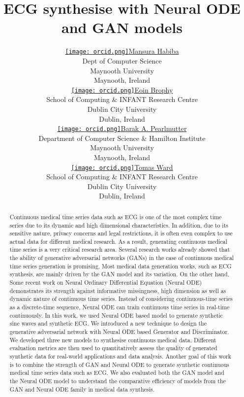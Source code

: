 \documentclass{article}
\title{ECG synthesise with Neural ODE and GAN models}
\author{ 
	\href{https://orcid.org/0000-0001-9051-1370}{\texttt{[image: orcid.png]}\hspace{1mm}Mansura Habiba} \\
	Dept of Computer Science\\
	Maynooth University\\
	Maynooth, Ireland \\
	\AND
	\href{https://orcid.org/0000-0002-6486-5746}{\texttt{[image: orcid.png]}\hspace{1mm}Eoin Brophy} \\
	School of Computing  \& INFANT Research Centre\\
		Dublin City University\\
	Dublin, Ireland \\
	\AND
	\href{https://orcid.org/0000-0003-0521-4553}{\texttt{[image: orcid.png]}\hspace{1mm}Barak A. Pearlmutter} \\
	Department of Computer Science \& Hamilton Institute\\
	Maynooth University\\
	Maynooth, Ireland \\
	\AND
	\href{https://orcid.org/0000-0002-6173-6607}{\texttt{[image: orcid.png]}\hspace{1mm}Tomas Ward} \\
	School of Computing  \& INFANT Research Centre\\
		Dublin City University\\
	Dublin, Ireland \\
}
\begin{document}
\maketitle

\begin{abstract}
 Continuous medical time series data such as ECG is one of the most complex time series due to its dynamic and high dimensional characteristics. In addition, due to its sensitive nature, privacy concerns and legal restrictions, it is often even complex to use actual data for different medical research. As a result, generating continuous medical time series is a very critical research area. Several research works already showed that the ability of generative adversarial networks (GANs) in the case of continuous medical time series generation is promising. Most medical data generation works, such as ECG synthesis, are mainly driven by the GAN model and its variation. On the other hand, Some recent work on Neural Ordinary Differential Equation (Neural ODE) demonstrates its strength against informative missingness, high dimension as well as dynamic nature of continuous time series. Instead of considering continuous-time series as a discrete-time sequence, Neural ODE can train continuous time series in real-time continuously. In this work, we used Neural ODE based model to generate synthetic sine waves and synthetic ECG. We introduced a new technique to design the generative adversarial network with Neural ODE based Generator and Discriminator. We developed three new models to synthesise continuous medical data. Different evaluation metrics are then used to quantitatively assess the quality of generated synthetic data for real-world applications and data analysis.  Another goal of this work is to combine the strength of GAN and Neural ODE to generate synthetic continuous medical time series data such as ECG. We also evaluated both the GAN model and the Neural ODE model to understand the comparative efficiency of models from the GAN and Neural ODE family in medical data synthesis.          
\end{abstract}


\end{document}

